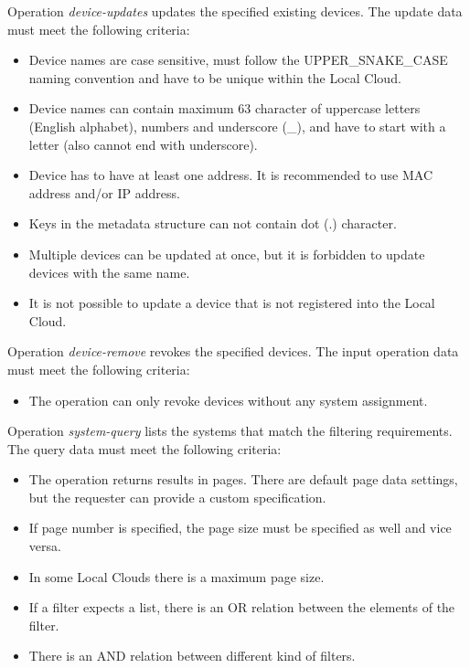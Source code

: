 \documentclass[a4paper]{arrowhead}
\begin{document}
Operation \textit{device-updates} updates the specified existing devices. The update data must meet the following criteria:

\begin{itemize}
    \item Device names are case sensitive, must follow the UPPER\_SNAKE\_CASE naming convention and have to be unique within the Local Cloud.
    \item Device names can contain maximum 63 character of uppercase letters (English alphabet), numbers and underscore (\_), and have to start with a letter (also cannot end with underscore).
    \item Device has to have at least one address. It is recommended to use MAC address and/or IP address.
    \item Keys in the metadata structure can not contain dot (.) character.
    \item Multiple devices can be updated at once, but it is forbidden to update devices with the same name.
    \item It is not possible to update a device that is not registered into the Local Cloud.
\end{itemize}


Operation \textit{device-remove} revokes the specified devices. The input operation data must meet the following criteria:

\begin{itemize}
    \item The operation can only revoke devices without any system assignment.
\end{itemize}


Operation \textit{system-query} lists the systems that match the filtering requirements. The query data must meet the following criteria:

\begin{itemize}
    \item The operation returns results in pages. There are default page data settings, but the requester can provide a custom specification.
    \item If page number is specified, the page size must be specified as well and vice versa.
    \item In some Local Clouds there is a maximum page size.
    \item If a filter expects a list, there is an OR relation between the elements of the filter.
    \item There is an AND relation between different kind of filters.
\end{itemize}
\end{document}
